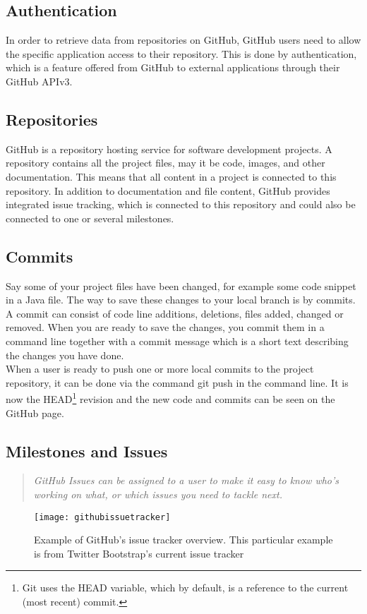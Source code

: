 \subsection{Authentication}
In order to retrieve data from repositories on GitHub, GitHub users need to allow the specific application access to their repository. This is done by authentication, which is a feature offered from GitHub to external applications through their GitHub APIv3.
\subsection{Repositories}
GitHub is a repository hosting service for software development projects. A repository contains all the project files, may it be code, images, and other documentation. This means that all content in a project is connected to this repository. In addition to documentation and file content, GitHub provides integrated issue tracking, which is connected to this repository and could also be connected to one or several milestones. 
\subsection{Commits}
Say some of your project files have been changed, for example some code snippet in a Java file. The way to save these changes to your local branch is by commits. A commit can consist of code line additions, deletions, files added, changed or removed. When you are ready to save the changes, you commit them in a command line together with a commit message which is a short text describing the changes you have done. \\
When a user is ready to push one or more local commits to the project repository, it can be done via the command git push in the command line. It is now the HEAD\footnote{Git uses the HEAD variable, which by default, is a reference to the current (most recent) commit.} revision and the new code and commits can be seen on the GitHub page.
\subsection{Milestones and Issues}
\begin{quote}
\em GitHub Issues can be assigned to a user to make it easy to know who's working on what, or which issues you need to tackle next.
\end{quote}
\begin{figure}[H]
\centering
	\texttt{[image: githubissuetracker]}
\caption{Example of GitHub's issue tracker overview. This particular example is from Twitter Bootstrap's current issue tracker}
\label{githubissuetracker}
\end{figure}

